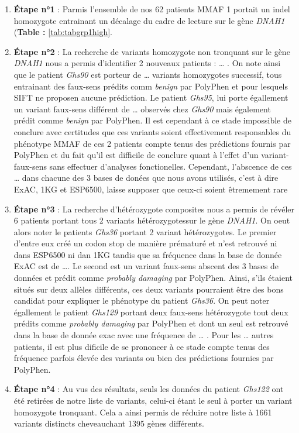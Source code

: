 \documentclass[12pt,twoside]{reedthesis}
\providecommand{\tightlist}{%
  \setlength{\itemsep}{0pt}\setlength{\parskip}{0pt}}
\theoremstyle{definition}
\theoremstyle{definition}
\theoremstyle{remark}
\begin{document}
  \begin{enumerate}
  \def\labelenumi{\arabic{enumi}.}
  \tightlist
  \item
    \textbf{Étape n°1} : Parmis l'ensemble de nos 62 patients MMAF 1
    portait un indel homozygote entrainant un décalage du cadre de lecture
    sur le gène \emph{DNAH1} (\textbf{Table : }\ref{tab:tabgrp1high}.\\
  \item
    \textbf{Étape n°2} : La recherche de variants homozygote non tronquant
    sur le gène \emph{DNAH1} nous a permis d'identifier 2 nouveaux
    patients : \ldots{} . On note ainsi que le patient \emph{Ghs90} est
    porteur de \ldots{} variants homozygotes successif, tous entrainant
    des faux-sens prédits comm \emph{benign} par PolyPhen et pour lesquels
    SIFT ne proposen aucune prédiction. Le patient \emph{Ghs95}, lui porte
    égallement un variant faux-sens différent de \ldots{} observés chez
    \emph{Ghs90} mais également prédit comme \emph{benign} par PolyPhen.
    Il est cependant à ce stade impossible de conclure avec certitudes que
    ces variants soient effectivement responsables du phénotype MMAF de
    ces 2 patients compte tenus des prédictions fournis par PolyPhen et du
    fait qu'il est difficile de conclure quant à l'effet d'un
    variant-faux-sens sans effectuer d'analyses fonctionelles. Cependant,
    l'abscence de ces \ldots{} dans chacune des 3 bases de donées que nous
    avons utilisés, c'est à dire ExAC, 1KG et ESP6500, laisse supposer que
    ceux-ci soient êtremement rare
  \item
    \textbf{Étape n°3} : La recherche d'hétérozygote composites nous a
    permis de révéler 6 patients portant tous 2 variants hétérozygotessur
    le gène \emph{DNAH1}. On oeut alors noter le patients \emph{Ghs36}
    portant 2 variant hétérozygotes. Le premier d'entre eux créé un codon
    stop de manière prématuré et n'est retrouvé ni dans ESP6500 ni dan 1KG
    tandis que sa fréquence dans la base de donnée ExAC est de \ldots{}.
    Le second est un variant faux-sens abscent des 3 bases de données et
    prédit comme \emph{probably damaging} par PolyPhen. Ainsi, s'ils
    étaient situés sur deux allèles différents, ces deux variants
    pourraient être des bons candidat pour expliquer le phénotype du
    patient \emph{Ghs36}. On peut noter égallement le patient
    \emph{Ghs129} portant deux faux-sens hétérozygote tout deux prédits
    comme \emph{probably damaging} par PolyPhen et dont un seul est
    retrouvé dans la base de donnée exac avec une fréquence de \ldots{} .
    Pour les \ldots{} autres patients, il est plus dificile de se
    prononcer à ce stade compte tenus des fréquence parfois élevée des
    variants ou bien des prédictions fournies par PolyPhen.\\
  \item
    \textbf{Étape n°4} : Au vus des résultats, seuls les données du
    patient \emph{Ghs122} ont été retirées de notre liste de variants,
    celui-ci étant le seul à porter un variant homozygote tronquant. Cela
    a ainsi permis de réduire notre liste à 1661 variants distincts
    cheveauchant 1395 gènes différents.
  \end{enumerate}
  
\end{document}
